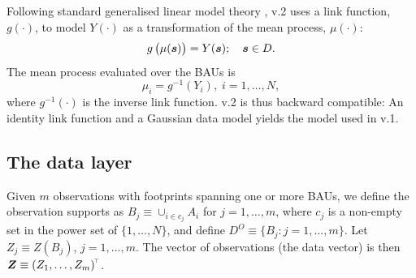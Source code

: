\documentclass[nojss]{jss}
\def\mbf#1{{%
\mathchoice%
{\hbox{\boldmath$\displaystyle{#1}$}}%
{\hbox{\boldmath$\textstyle{#1}$}}%
{\hbox{\boldmath$\scriptstyle{#1}$}}%
{\hbox{\boldmath$\scriptscriptstyle{#1}$}}%
}}
\def\vec{\mbf}
\newcommand{\tp}{{\!\scriptscriptstyle \top}}
\begin{document}
Following standard generalised linear model theory \citep{McCullagh_Nelder_1989_GLM},  v.2 uses a link function, $g(\cdot)$, to model $Y(\cdot)$ as a transformation of the mean process, $\mu(\cdot)$:
\[
g\left(\mu(\vec{s})\right) = Y(\vec{s}); \quad \vec{s} \in D.
\]
The mean process evaluated over the BAUs is 
\[
\mu_i = g^{-1}(Y_i), \; i = 1, \dots, N,
\]
where $g^{-1}(\cdot)$ is the inverse link function. 
  v.2 is thus backward compatible: An identity link function and a Gaussian data model yields the model used in  v.1.


\subsection{The data layer}\label{subsection:04-02:DataLayer}




Given $m$ observations with footprints spanning one or more BAUs, we define the observation supports as $B_j \equiv \cup_{i\in c_j} A_i$ for $j = 1, \dots, m$, where $c_j$ is a non-empty set in the power set of $\{1, \dots, N\}$, and define $D^O \equiv \{B_j : j = 1, \dots, m\}$. 
Let $Z_j \equiv Z(B_j)$, $j = 1, \dots, m$. 
The vector of observations (the data vector) is then $\vec{Z} \equiv \left(Z_1, \dots, Z_m\right)^\tp$.
\end{document}
